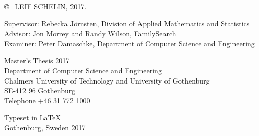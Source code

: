 \copyright ~ LEIF SCHELIN, 2017. \setlength{\parskip}{1cm}

Supervisor: Rebecka Jörnsten, Division of Applied Mathematics and Statistics\\
Advisor: Jon Morrey and Randy Wilson, FamilySearch\\
Examiner: Peter Damaschke, Department of Computer Science and Engineering \setlength{\parskip}{1cm}

Master's Thesis 2017\\	%
Department of Computer Science and Engineering\\
Chalmers University of Technology
and University of Gothenburg\\
SE-412 96 Gothenburg\\
Telephone +46 31 772 1000 \setlength{\parskip}{0.5cm}

\vfill


Typeset in \LaTeX \\
Gothenburg, Sweden 2017

